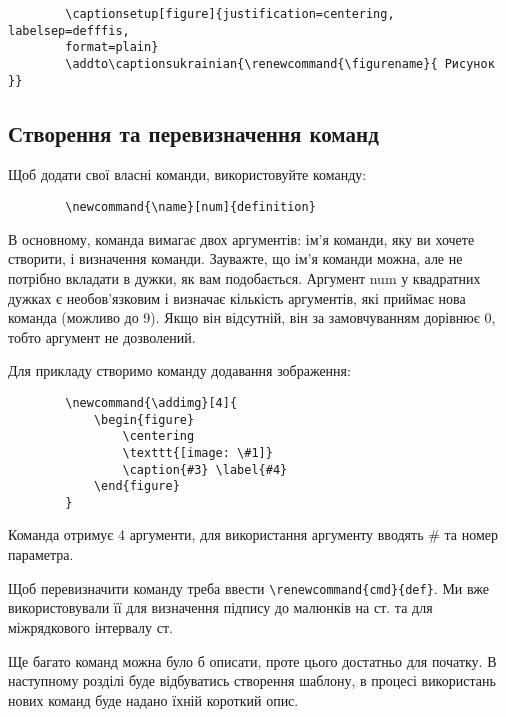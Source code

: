 \begin{lstlisting}
		\captionsetup[figure]{justification=centering, labelsep=defffis,
		format=plain}		
		\addto\captionsukrainian{\renewcommand{\figurename}{ Рисунок }}
\end{lstlisting}


\subsection{Створення та перевизначення команд}

Щоб додати свої власні команди, використовуйте команду:

\begin{lstlisting}
		\newcommand{\name}[num]{definition}
\end{lstlisting}


В основному, команда вимагає двох аргументів: ім'я команди, яку ви хочете створити, і визначення команди. Зауважте, що ім'я команди можна, але не потрібно вкладати в дужки, як вам подобається. Аргумент num у квадратних дужках є необов’язковим і визначає кількість аргументів, які приймає нова команда (можливо до 9). Якщо він відсутній, він за замовчуванням дорівнює 0, тобто аргумент не дозволений.

Для прикладу створимо команду додавання зображення:

\begin{lstlisting}
		\newcommand{\addimg}[4]{
			\begin{figure}
				\centering
				\texttt{[image: \#1]}
				\caption{#3} \label{#4}
			\end{figure}
		}
\end{lstlisting}

Команда отримує 4 аргументи, для використання аргументу вводять \# та номер параметра.

Щоб перевизначити команду треба ввести \verb|\renewcommand{cmd}{def}|. Ми вже використовували її для визначення підпису до малюнків на ст. \pageref{capt} та для міжрядкового інтервалу ст. \pageref{par}

Ще багато команд можна було б описати, проте цього достатньо для початку. В наступному розділі буде відбуватись створення шаблону, в процесі використань нових команд буде надано  їхній короткий опис.


